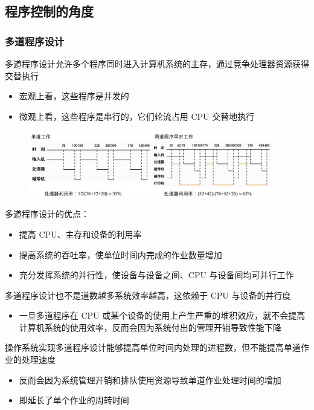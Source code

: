 \documentclass[cs4size,a4paper,10pt]{ctexart}
\begin{document}
		\subsection{程序控制的角度}
		\subsubsection{多道程序设计}
		多道程序设计允许多个程序同时进入计算机系统的主存，通过竞争处理器资源获得交替执行
		\begin{itemize}
			\item 宏观上看，这些程序是并发的
			\item 微观上看，这些程序是串行的，它们轮流占用 CPU 交替地执行
		\end{itemize}
		\begin{figure}[H]
			\centering
			\includegraphics[width=0.95\textwidth]{img/1.3.2.1}
		\end{figure}

		多道程序设计的优点：
		\begin{itemize}
			\item 提高 CPU、主存和设备的利用率
			\item 提高系统的吞吐率，使单位时间内完成的作业数量增加
			\item 充分发挥系统的并行性，使设备与设备之间、CPU 与设备间均可并行工作
		\end{itemize}

		多道程序设计也不是道数越多系统效率越高，这依赖于 CPU 与设备的并行度
		\begin{itemize}
			\item 一旦多道程序在 CPU 或某个设备的使用上产生严重的堆积效应，就不会提高计算机系统的使用效率，反而会因为系统付出的管理开销导致性能下降
		\end{itemize}

		操作系统实现多道程序设计能够提高单位时间内处理的进程数，但不能提高单道作业的处理速度
		\begin{itemize}
			\item 反而会因为系统管理开销和排队使用资源导致单道作业处理时间的增加
			\item 即延长了单个作业的周转时间
		\end{itemize}
\end{document}
